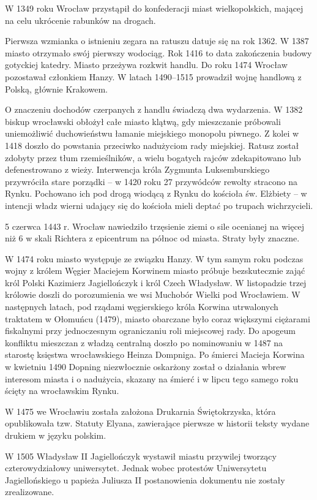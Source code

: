 \documentclass{article}
\begin{document}
W 1349 roku Wrocław przystąpił do konfederacji miast wielkopolskich, mającej na celu ukrócenie rabunków na drogach.

Pierwsza wzmianka o istnieniu zegara na ratuszu datuje się na rok 1362. W 1387 miasto otrzymało swój pierwszy wodociąg. Rok 1416 to data zakończenia budowy gotyckiej katedry. Miasto przeżywa rozkwit handlu. Do roku 1474 Wrocław pozostawał członkiem Hanzy. W latach 1490–1515 prowadził wojnę handlową z Polską, głównie Krakowem.

O znaczeniu dochodów czerpanych z handlu świadczą dwa wydarzenia. W 1382 biskup wrocławski obłożył całe miasto klątwą, gdy mieszczanie próbowali uniemożliwić duchowieństwu łamanie miejskiego monopolu piwnego. Z kolei w 1418 doszło do powstania przeciwko nadużyciom rady miejskiej. Ratusz został zdobyty przez tłum rzemieślników, a wielu bogatych rajców zdekapitowano lub defenestrowano z wieży. Interwencja króla Zygmunta Luksemburskiego przywróciła stare porządki – w 1420 roku 27 przywódców rewolty stracono na Rynku. Pochowano ich pod drogą wiodącą z Rynku do kościoła św. Elżbiety – w intencji władz wierni udający się do kościoła mieli deptać po trupach wichrzycieli.

5 czerwca 1443 r. Wrocław nawiedziło trzęsienie ziemi o sile ocenianej na więcej niż 6 w skali Richtera z epicentrum na północ od miasta. Straty były znaczne.

W 1474 roku miasto występuje ze związku Hanzy. W tym samym roku podczas wojny z królem Węgier Maciejem Korwinem miasto próbuje bezskutecznie zająć król Polski Kazimierz Jagiellończyk i król Czech Władysław. W listopadzie trzej królowie doszli do porozumienia we wsi Muchobór Wielki pod Wrocławiem. W następnych latach, pod rządami węgierskiego króla Korwina utrwalonych traktatem w Ołomuńcu (1479), miasto obarczane było coraz większymi ciężarami fiskalnymi przy jednoczesnym ograniczaniu roli miejscowej rady. Do apogeum konfliktu mieszczan z władzą centralną doszło po nominowaniu w 1487 na starostę księstwa wrocławskiego Heinza Dompniga. Po śmierci Macieja Korwina w kwietniu 1490 Dopning niezwłocznie oskarżony został o działania wbrew interesom miasta i o nadużycia, skazany na śmierć i w lipcu tego samego roku ścięty na wrocławskim Rynku.

W 1475 we Wrocławiu została założona Drukarnia Świętokrzyska, która opublikowała tzw. Statuty Elyana, zawierające pierwsze w historii teksty wydane drukiem w języku polskim.

W 1505 Władysław II Jagiellończyk wystawił miastu przywilej tworzący czterowydziałowy uniwersytet. Jednak wobec protestów Uniwersytetu Jagiellońskiego u papieża Juliusza II postanowienia dokumentu nie zostały zrealizowane.
\end{document}
